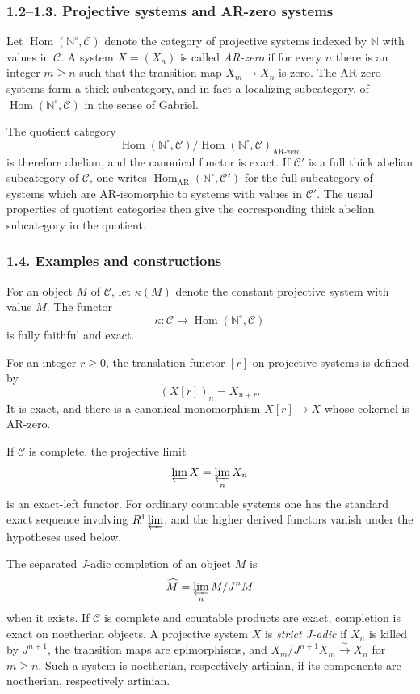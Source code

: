 \documentclass[12pt]{article}
\newcommand{\bN}{\mathbb N}
\newcommand{\cC}{\mathcal C}
\newcommand{\Hom}{\operatorname{Hom}}
\newcommand{\AR}{\mathrm{AR}}
\begin{document}
\subsubsection*{1.2--1.3. Projective systems and AR-zero systems}

Let $\Hom(\bN^\circ,\cC)$ denote the category of projective systems indexed by
$\bN$ with values in $\cC$. A system $X=(X_n)$ is called \emph{AR-zero} if for every
$n$ there is an integer $m\ge n$ such that the transition map
$X_m\to X_n$ is zero. The AR-zero systems form a thick subcategory, and in fact a
localizing subcategory, of $\Hom(\bN^\circ,\cC)$ in the sense of Gabriel.

The quotient category
\[
     \Hom(\bN^\circ,\cC)/\Hom(\bN^\circ,\cC)_{\AR\text{-zero}}
\]
is therefore abelian, and the canonical functor is exact. If $\cC'$ is a full thick
abelian subcategory of $\cC$, one writes
$\Hom_{\AR}(\bN^\circ,\cC')$ for the full subcategory of systems which are
AR-isomorphic to systems with values in $\cC'$. The usual properties of quotient
categories then give the corresponding thick abelian subcategory in the quotient.

\subsubsection*{1.4. Examples and constructions}

For an object $M$ of $\cC$, let $\kappa(M)$ denote the constant projective system
with value $M$. The functor
\[
       \kappa:\cC\longrightarrow \Hom(\bN^\circ,\cC)
\]
is fully faithful and exact.

For an integer $r\ge0$, the translation functor $[r]$ on projective systems is
defined by
\[
      (X[r])_n=X_{n+r}.
\]
It is exact, and there is a canonical monomorphism $X[r]\to X$ whose cokernel is
AR-zero.

If $\cC$ is complete, the projective limit
\[
      \varprojlim X=\varprojlim_n X_n
\]
is an exact-left functor. For ordinary countable systems one has the standard exact
sequence involving $R^1\varprojlim$, and the higher derived functors vanish under
the hypotheses used below.

The separated $J$-adic completion of an object $M$ is
\[
      \widehat M=\varprojlim_n M/J^nM
\]
when it exists. If $\cC$ is complete and countable products are exact, completion is
exact on noetherian objects. A projective system $X$ is \emph{strict $J$-adic} if
$X_n$ is killed by $J^{n+1}$, the transition maps are epimorphisms, and
$X_m/J^{n+1}X_m\xrightarrow{\sim}X_n$ for $m\ge n$. Such a system is noetherian,
respectively artinian, if its components are noetherian, respectively artinian.
\end{document}

